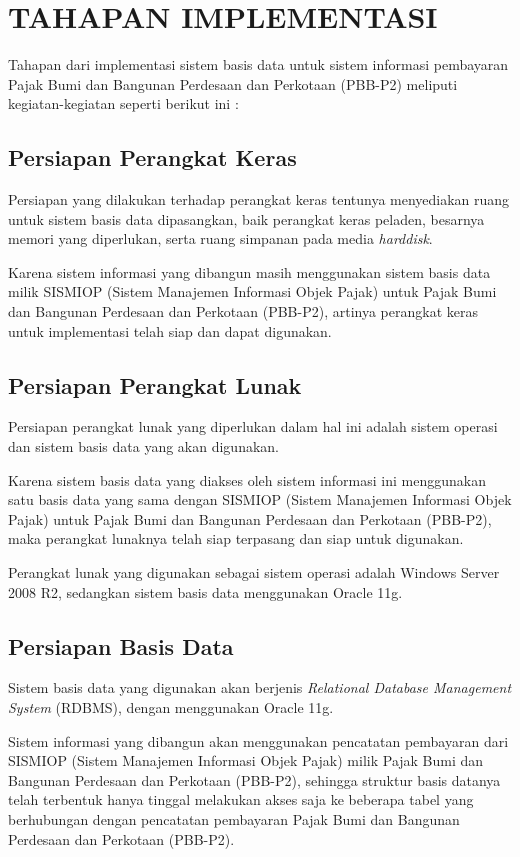 \chapter{TAHAPAN IMPLEMENTASI}

Tahapan dari implementasi sistem basis data untuk sistem informasi pembayaran Pajak Bumi dan Bangunan Perdesaan dan Perkotaan (PBB-P2) meliputi kegiatan-kegiatan seperti berikut ini :

\section{Persiapan Perangkat Keras}

Persiapan yang dilakukan terhadap perangkat keras tentunya menyediakan ruang untuk sistem basis data dipasangkan, baik perangkat keras peladen, besarnya memori yang diperlukan, serta ruang simpanan pada media \textit{harddisk}.

Karena sistem informasi yang dibangun masih menggunakan sistem basis data milik SISMIOP (Sistem Manajemen Informasi Objek Pajak) untuk Pajak Bumi dan Bangunan Perdesaan dan Perkotaan (PBB-P2), artinya perangkat keras untuk implementasi telah siap dan dapat digunakan.

\section{Persiapan Perangkat Lunak}

Persiapan perangkat lunak yang diperlukan dalam hal ini adalah sistem operasi dan sistem basis data yang akan digunakan.

Karena sistem basis data yang diakses oleh sistem informasi ini menggunakan satu basis data yang sama dengan SISMIOP (Sistem Manajemen Informasi Objek Pajak) untuk Pajak Bumi dan Bangunan Perdesaan dan Perkotaan (PBB-P2), maka perangkat lunaknya telah siap terpasang dan siap untuk digunakan.

Perangkat lunak yang digunakan sebagai sistem operasi adalah Windows Server 2008 R2, sedangkan sistem basis data menggunakan Oracle 11g.

\section{Persiapan Basis Data}

Sistem basis data yang digunakan akan berjenis \textit{Relational Database Management System} (RDBMS), dengan menggunakan Oracle 11g.

Sistem informasi yang dibangun akan menggunakan pencatatan pembayaran dari SISMIOP (Sistem Manajemen Informasi Objek Pajak) milik Pajak Bumi dan Bangunan Perdesaan dan Perkotaan (PBB-P2), sehingga struktur basis datanya telah terbentuk hanya tinggal melakukan akses saja ke beberapa tabel yang berhubungan dengan pencatatan pembayaran Pajak Bumi dan Bangunan Perdesaan dan Perkotaan (PBB-P2).

